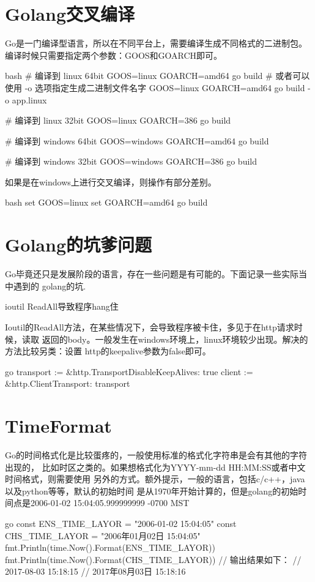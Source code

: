 \section{Golang交叉编译}
Go是一门编译型语言，所以在不同平台上，需要编译生成不同格式的二进制包。
编译时候只需要指定两个参数：GOOS和GOARCH即可。
\begin{code-block}{bash}
# 编译到 linux 64bit
GOOS=linux GOARCH=amd64 go build
# 或者可以使用 -o 选项指定生成二进制文件名字
GOOS=linux GOARCH=amd64 go build -o app.linux

# 编译到 linux 32bit
GOOS=linux GOARCH=386 go build

# 编译到 windows 64bit
GOOS=windows GOARCH=amd64 go build

# 编译到 windows 32bit
GOOS=windows GOARCH=386 go build
\end{code-block}

如果是在windows上进行交叉编译，则操作有部分差别。
\begin{code-block}{bash}
set GOOS=linux
set GOARCH=amd64
go build
\end{code-block}

\section{Golang的坑爹问题}
Go毕竟还只是发展阶段的语言，存在一些问题是有可能的。下面记录一些实际当中遇到的
golang的坑.
\begin{outline}[enumerate]

  \1 ioutil ReadAll导致程序hang住

  Ioutil的ReadAll方法，在某些情况下，会导致程序被卡住，多见于在http请求时候，读取
  返回的body。一般发生在windows环境上，linux环境较少出现。解决的方法比较另类：设置
  http的keepalive参数为false即可。
\begin{code-in-enumerate}{go}
transport := &http.Transport{DisableKeepAlives: true}
client := &http.Client{Transport: transport}
\end{code-in-enumerate}

\end{outline}

\section{TimeFormat}
Go的时间格式化是比较蛋疼的，一般使用标准的格式化字符串是会有其他的字符出现的，
比如时区之类的。如果想格式化为YYYY-mm-dd HH:MM:SS或者中文时间格式，则需要使用
另外的方式。额外提示，一般的语言，包括c/c++，java以及python等等，默认的初始时间
是从1970年开始计算的，但是golang的初始时间点是2006-01-02 15:04:05.999999999 -0700 MST
\begin{code-block}{go}
const ENS_TIME_LAYOR = "2006-01-02 15:04:05"
const CHS_TIME_LAYOR = "2006年01月02日 15:04:05"
fmt.Println(time.Now().Format(ENS_TIME_LAYOR))
fmt.Println(time.Now().Format(CHS_TIME_LAYOR))
// 输出结果如下：
// 2017-08-03 15:18:15
// 2017年08月03日 15:18:16
\end{code-block}

